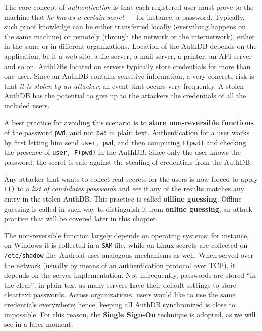 \documentclass[10pt]{\classname}
\begin{document}
The core concept of \emph{authentication} is that each registered user must
prove to the machine that \emph{he knows a certain secret} --- for instance, a
password. Typically, such proof knowledge can be either transferred locally
(everything happens on the same machine) or remotely (through the network or
the internetwork), either in the same or in different organizations. Location
of the AuthDB depends on the application; be it a web site, a file server, a
mail server, a printer, an API server and so on. AuthDBs located on servers
typically store credentials for more than one user. Since an AuthDB contains
sensitive information, a very concrete risk is that \emph{it is stolen by an
attacker}; an event that occurs very frequently. A stolen AuthDB has the
potential to give up to the attackers the credentials of all the included
users.

A best practice for avoiding this scenario is to \textbf{store non\--reversible
functions} of the password \texttt{pwd}, and not \texttt{pwd} in plain text.
Authentication for a user works by first letting him send \texttt{user, pwd},
and then computing \texttt{F(pwd)} and checking the presence of \texttt{user,
F(pwd)} in the AuthDB. Since only the user knows the password, the secret is
safe against the stealing of credentials from the AuthDB.

Any attacker that wants to collect real secrets for the users is now forced to
apply \texttt{F()} to a \emph{list of candidates passwords} and see if any of
the results matches any entry in the stolen AuthDB. This practice is called
\textbf{offline guessing}. Offline guessing is called in such way to
distinguish it from \textbf{online guessing}, an attack practice that will be
covered later in this chapter.

The non\--reversible function largely depends on operating systems: for
instance, on Windows it is collected in a \texttt{SAM} file, while on Linux
secrets are collected on \texttt{/etc/shadow} file. Android uses analogous
mechanisms as well. When served over the network (usually by means of an
authentication protocol over TCP), it depends on the server implementation. Not
infrequently, passwords are stored ``in the clear'', in plain text as many
servers have their default settings to store cleartext passwords. Across
organizations, users would like to use the same credentials everywhere; hence,
keeping all AuthDB synchronized is close to impossible. For this reason, the
\textbf{Single Sign\--On} technique is adopted, as we will see in a later
moment.
\end{document}
